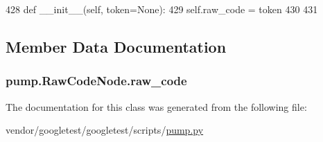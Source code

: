 \begin{DoxyCode}
428   \textcolor{keyword}{def }\_\_init\_\_(self, token=None):
429     self.raw\_code = token
430 
431 
\end{DoxyCode}


\subsection{Member Data Documentation}
\subsubsection[{\texorpdfstring{raw\+\_\+code}{raw_code}}]{\setlength{\rightskip}{0pt plus 5cm}pump.\+Raw\+Code\+Node.\+raw\+\_\+code}\hypertarget{classpump_1_1RawCodeNode_ab36224d959e0d8f803e9fac8e6a0baab}{}\label{classpump_1_1RawCodeNode_ab36224d959e0d8f803e9fac8e6a0baab}


The documentation for this class was generated from the following file\+:\begin{DoxyCompactItemize}
\item 
vendor/googletest/googletest/scripts/\hyperlink{pump_8py}{pump.\+py}\end{DoxyCompactItemize}

